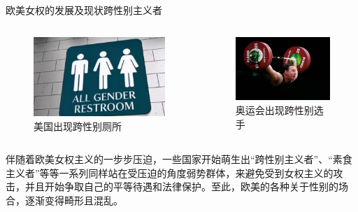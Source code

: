 \documentclass{beamer}
\begin{document}
	\begin{frame}{欧美女权的发展及现状}{跨性别主义者}
		\begin{columns}
			\begin{figure}
				\centering
				\includegraphics[width=\textwidth]{img/图片4.png}
				\caption{美国出现跨性别厕所}
			\end{figure}

			\begin{figure}
				\centering
				\includegraphics[width=\textwidth]{img/图片5.jpg}
				\caption{奥运会出现跨性别选手}
			\end{figure}
		\end{columns}

		伴随着欧美女权主义的一步步压迫，一些国家开始萌生出“跨性别主义者”、“素食主义者”等等一系列同样站在受压迫的角度弱势群体，来避免受到女权主义的攻击，并且开始争取自己的平等待遇和法律保护。至此，欧美的各种关于性别的场合，逐渐变得畸形且混乱。

	\end{frame}
\end{document}
